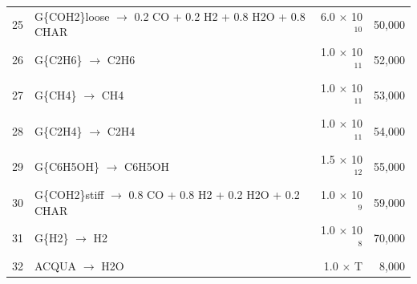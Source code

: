 \begin{center}
\begin{longtable}{cp{4in}rr}
    25 & G\{COH2\}loose $\rightarrow$ 0.2 CO + 0.2 H2 + 0.8 H2O + 0.8 CHAR & 6.0 $\times$ 10$^{10}$ & 50,000 \\
    26 & G\{C2H6\} $\rightarrow$ C2H6 & 1.0 $\times$ 10$^{11}$ & 52,000 \\
    27 & G\{CH4\} $\rightarrow$ CH4 & 1.0 $\times$ 10$^{11}$ & 53,000 \\
    28 & G\{C2H4\} $\rightarrow$ C2H4 & 1.0 $\times$ 10$^{11}$ & 54,000 \\
    29 & G\{C6H5OH\} $\rightarrow$ C6H5OH & 1.5 $\times$ 10$^{12}$ & 55,000 \\
    30 & G\{COH2\}stiff $\rightarrow$ 0.8 CO + 0.8 H2 + 0.2 H2O + 0.2 CHAR & 1.0 $\times$ 10$^9$ & 59,000 \\
    31 & G\{H2\} $\rightarrow$ H2 & 1.0 $\times$ 10$^8$ & 70,000 \\
    32 & ACQUA $\rightarrow$ H2O & 1.0 $\times$ T & 8,000 \\
    \bottomrule
\end{longtable}
\end{center}

